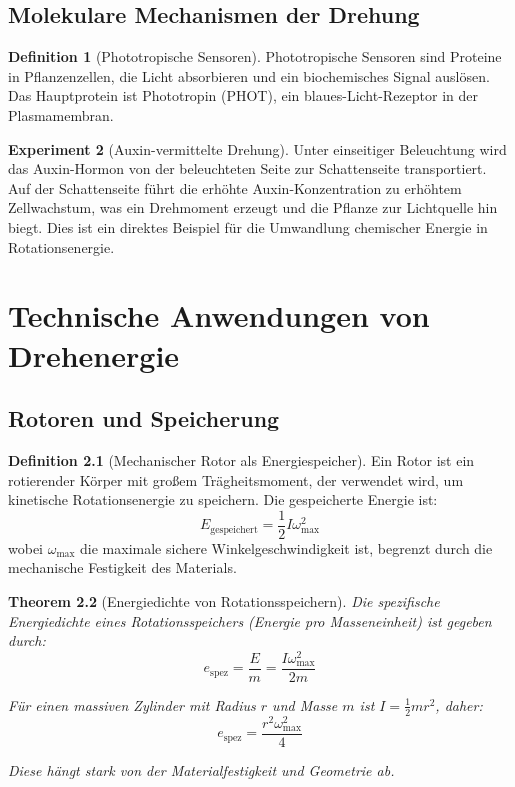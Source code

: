 \documentclass[12pt,a4paper]{report}
\theoremstyle{plain}
\newtheorem{theorem}{Theorem}[section]
\theoremstyle{definition}
\newtheorem{definition}[theorem]{Definition}
\newtheorem{experiment}[theorem]{Experiment}
\theoremstyle{remark}
\begin{document}
\section{Molekulare Mechanismen der Drehung}

\begin{definition}[Phototropische Sensoren]
	Phototropische Sensoren sind Proteine in Pflanzenzellen, die Licht absorbieren und ein biochemisches Signal auslösen. Das Hauptprotein ist Phototropin (PHOT), ein blaues-Licht-Rezeptor in der Plasmamembran.
\end{definition}

\begin{experiment}[Auxin-vermittelte Drehung]
	Unter einseitiger Beleuchtung wird das Auxin-Hormon von der beleuchteten Seite zur Schattenseite transportiert. Auf der Schattenseite führt die erhöhte Auxin-Konzentration zu erhöhtem Zellwachstum, was ein Drehmoment erzeugt und die Pflanze zur Lichtquelle hin biegt. Dies ist ein direktes Beispiel für die Umwandlung chemischer Energie in Rotationsenergie.
\end{experiment}

\chapter{Technische Anwendungen von Drehenergie}

\section{Rotoren und Speicherung}

\begin{definition}[Mechanischer Rotor als Energiespeicher]
	Ein Rotor ist ein rotierender Körper mit großem Trägheitsmoment, der verwendet wird, um kinetische Rotationsenergie zu speichern. Die gespeicherte Energie ist:
	\[
	E_{\text{gespeichert}} = \frac{1}{2} I \omega_{\max}^2
	\]
	wobei $\omega_{\max}$ die maximale sichere Winkelgeschwindigkeit ist, begrenzt durch die mechanische Festigkeit des Materials.
\end{definition}

\begin{theorem}[Energiedichte von Rotationsspeichern]
	Die spezifische Energiedichte eines Rotationsspeichers (Energie pro Masseneinheit) ist gegeben durch:
	\[
	e_{\text{spez}} = \frac{E}{m} = \frac{I \omega_{\max}^2}{2m}
	\]
	
	Für einen massiven Zylinder mit Radius $r$ und Masse $m$ ist $I = \frac{1}{2} m r^2$, daher:
	\[
	e_{\text{spez}} = \frac{r^2 \omega_{\max}^2}{4}
	\]
	
	Diese hängt stark von der Materialfestigkeit und Geometrie ab.
\end{theorem}
\end{document}
